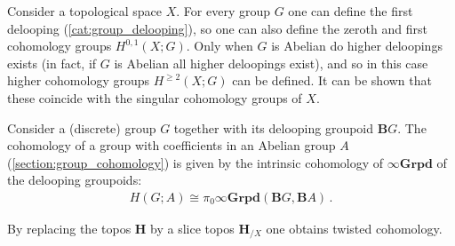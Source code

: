     \begin{example}
        Consider a topological space $X$. For every group $G$ one can define the first delooping (\cref{cat:group_delooping}), so one can also define the zeroth and first cohomology groups $H^{0,1}(X;G)$. Only when $G$ is Abelian do higher deloopings exists (in fact, if $G$ is Abelian all higher deloopings exist), and so in this case higher cohomology groups $H^{\geq 2}(X;G)$ can be defined. It can be shown that these coincide with the singular cohomology groups of $X$.
    \end{example}

    \begin{example}
        Consider a (discrete) group $G$ together with its delooping groupoid $\mathbf{B}G$. The cohomology of a group with coefficients in an Abelian group $A$ (\cref{section:group_cohomology}) is given by the intrinsic cohomology of $\infty\mathbf{Grpd}$ of the delooping groupoids:
        \begin{gather}
            H(G;A)\cong\pi_0\infty\mathbf{Grpd}(\mathbf{B}G,\mathbf{B}A)\,.
        \end{gather}
    \end{example}

    By replacing the topos $\mathbf{H}$ by a slice topos $\mathbf{H}_{/X}$ one obtains twisted cohomology.
